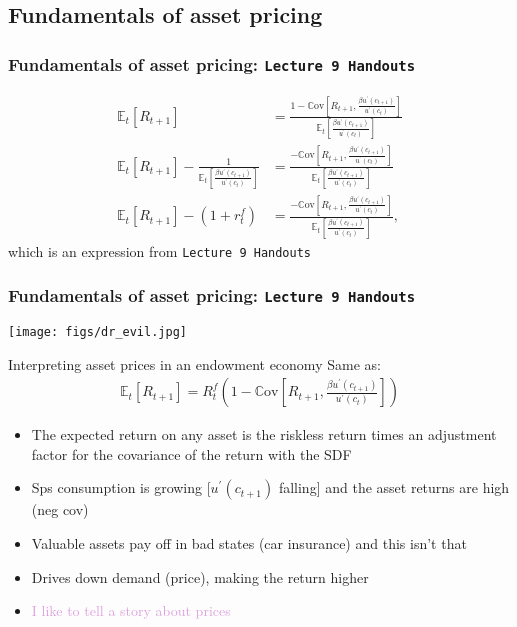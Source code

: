 \documentclass[presentation,dvipsnames]{beamer}
\begin{document}
\subsection{Fundamentals of asset pricing}

\begin{frame}
\frametitle{Fundamentals of asset pricing: \texttt{Lecture 9 Handouts}}
\begin{align*}
\mathbb{E}_{t} \left[ R_{t+1} \right] &=
\frac{1 - \mathbb{C} \text{ov} \left[ R_{t+1}, \frac{\beta u^{\prime}(c_{t+1})}{u^{\prime}(c_{t})} \right]}{
  \mathbb{E}_{t} \left[ \frac{\beta u^{\prime}(c_{t+1})}{u^{\prime}(c_{t})} \right]} \\
\mathbb{E}_{t} \left[ R_{t+1} \right] - \frac{1}{\mathbb{E}_{t} \left[ \frac{\beta u^{\prime}(c_{t+1})}{u^{\prime}(c_{t})} \right]} &=
\frac{- \mathbb{C} \text{ov} \left[ R_{t+1}, \frac{\beta u^{\prime}(c_{t+1})}{u^{\prime}(c_{t})} \right]}{
  \mathbb{E}_{t} \left[ \frac{\beta u^{\prime}(c_{t+1})}{u^{\prime}(c_{t})} \right]} \\
\mathbb{E}_{t} \left[ R_{t+1} \right] - (1+r_{t}^{f}) &= \frac{- \mathbb{C} \text{ov} \left[ R_{t+1}, \frac{\beta u^{\prime}(c_{t+1})}{u^{\prime}(c_{t})} \right]}{
  \mathbb{E}_{t} \left[ \frac{\beta u^{\prime}(c_{t+1})}{u^{\prime}(c_{t})} \right]},
\end{align*}
which is an expression from \texttt{Lecture 9 Handouts}
\end{frame}

\begin{frame}
\frametitle{Fundamentals of asset pricing: \texttt{Lecture 9 Handouts}}
\centerline{\texttt{[image: figs/dr\_evil.jpg]}}
\end{frame}

\begin{frame}[label=sec-4-5]{Interpreting asset prices in an endowment economy}
Same as:
\begin{align*}
\mathbb{E}_{t} \left[ R_{t+1} \right] = R^{f}_{t} \left( 1 - \mathbb{C} \text{ov} \left[ R_{t+1}, \frac{\beta u^{\prime}(c_{t+1})}{u^{\prime}(c_{t})} \right] \right)
\end{align*}

\begin{itemize}[label={--}]
\item The expected return on any asset is the riskless return times an adjustment factor for the covariance of the return with the SDF
\item Sps consumption is growing [$u^{\prime}(c_{t+1})$ falling] and the asset returns are high (neg cov)
\item Valuable assets pay off in bad states (car insurance) and this isn't that
\item Drives down demand (price), making the return higher
\item \textcolor{Plum}{I like to tell a story about prices}
\end{itemize}
\end{frame}
\end{document}
